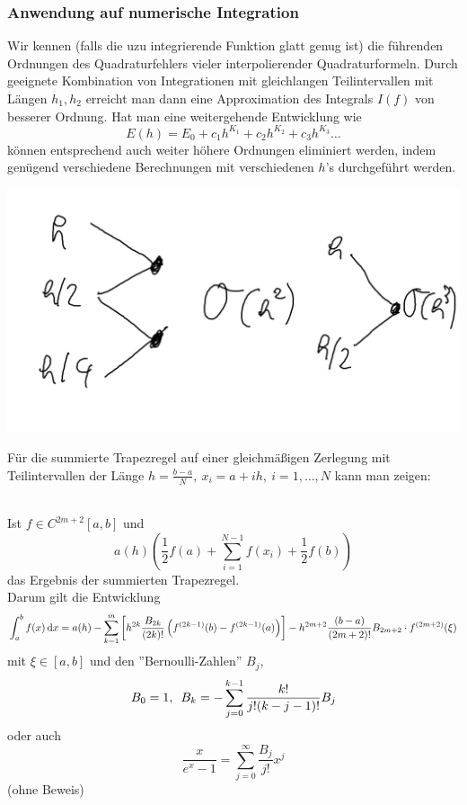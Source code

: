 \documentclass{../Skript}
\begin{document}
{%

\subsubsection*{Anwendung auf numerische Integration}
Wir kennen (falls die uzu integrierende Funktion glatt genug ist) die führenden
Ordnungen des Quadraturfehlers vieler interpolierender Quadraturformeln. Durch 
geeignete Kombination von Integrationen mit gleichlangen Teilintervallen mit 
Längen $h_1, h_2$ erreicht man dann eine Approximation des Integrals $I(f)$ von 
besserer Ordnung. Hat man eine weitergehende Entwicklung wie \[
    E(h) = E_0 + c_1h^{K_1} + c_2 h^{K_2} + c_3h^{K_3}\dots\]
können entsprechend auch weiter höhere Ordnungen eliminiert werden, indem 
genügend verschiedene Berechnungen mit verschiedenen $h$'s durchgeführt werden. 
\begin{example}
    \hfill
    \begin{center}
        \includegraphics[width=\linewidth]{../Bilder/051222_1.png}
    \end{center}
\end{example}
Für die summierte Trapezregel auf einer gleichmäßigen Zerlegung mit Teilintervallen der Länge \(h=\frac{b-a}{N},\ x_i=a+ih,\ i=1,\dots,N\)
kann man zeigen:
\begin{theorem}\hfill\\
    Ist \(f\in C^{2m+2}[a,b]\) und \[
    a(h)\left(\frac{1}{2}f(a)+\sum^{N-1}_{i=1}f(x_i)+\frac{1}{2}f(b)\right)\]
    das Ergebnis der summierten Trapezregel.\\
    Darum gilt die Entwicklung
    \newpage
    \[
        \int^b_af(x)\mathop{}\!\mathrm{d} x = 
        a(h)-\sum_{k=1}^m\left[h^{2k}\frac{B_{2k}}{(2k)!}\left(f^{(2k-1)}(b)-f^{(2k-1)}(a)\right)\right]-h^{2m+2}\frac{(b-a)}{(2m+2)!}B_{2m+2}\cdot f^{(2m+2)}(\xi)        
    \]
    mit $\xi\in[a,b]$ und den ''Bernoulli-Zahlen'' $B_j$, \[
        B_0 = 1, \hspace{.5em} B_k = -\sum_{j=0}^{k-1}\frac{k!}{j!(k-j-1)!}B_j
    \]
    oder auch \[
        \frac{x}{e^x - 1} = \sum_{j=0}^\infty \frac{B_j}{j!}x^j
    \]
    (ohne Beweis)
\end{theorem}

}
\end{document}
